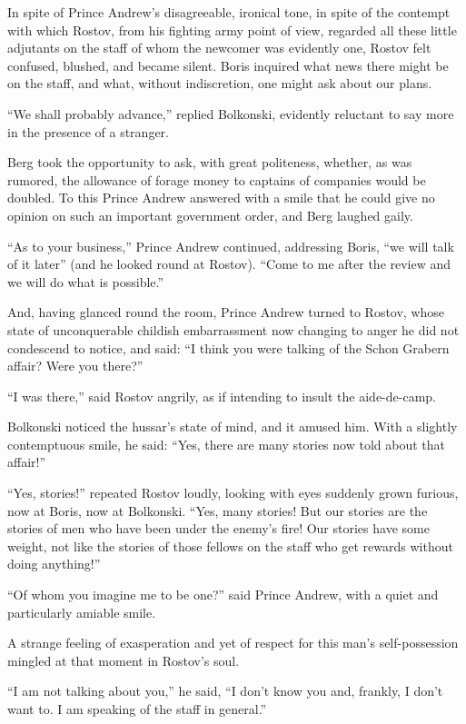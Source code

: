 In spite of Prince Andrew's disagreeable, ironical tone, in spite
of the contempt with which Rostov, from his fighting army point
of view, regarded all these little adjutants on the staff of whom
the newcomer was evidently one, Rostov felt confused, blushed,
and became silent.  Boris inquired what news there might be on
the staff, and what, without indiscretion, one might ask about
our plans.

``We shall probably advance,'' replied Bolkonski, evidently
reluctant to say more in the presence of a stranger.

Berg took the opportunity to ask, with great politeness, whether,
as was rumored, the allowance of forage money to captains of
companies would be doubled. To this Prince Andrew answered with a
smile that he could give no opinion on such an important
government order, and Berg laughed gaily.

``As to your business,'' Prince Andrew continued, addressing
Boris, ``we will talk of it later'' (and he looked round at
Rostov). ``Come to me after the review and we will do what is
possible.''

And, having glanced round the room, Prince Andrew turned to
Rostov, whose state of unconquerable childish embarrassment now
changing to anger he did not condescend to notice, and said: ``I
think you were talking of the Schon Grabern affair? Were you
there?''

``I was there,'' said Rostov angrily, as if intending to insult
the aide-de-camp.

Bolkonski noticed the hussar's state of mind, and it amused
him. With a slightly contemptuous smile, he said: ``Yes, there
are many stories now told about that affair!''

``Yes, stories!'' repeated Rostov loudly, looking with eyes
suddenly grown furious, now at Boris, now at Bolkonski. ``Yes,
many stories! But our stories are the stories of men who have
been under the enemy's fire! Our stories have some weight, not
like the stories of those fellows on the staff who get rewards
without doing anything!''

``Of whom you imagine me to be one?'' said Prince Andrew, with a
quiet and particularly amiable smile.

A strange feeling of exasperation and yet of respect for this
man's self-possession mingled at that moment in Rostov's soul.

``I am not talking about you,'' he said, ``I don't know you and,
frankly, I don't want to. I am speaking of the staff in
general.''

